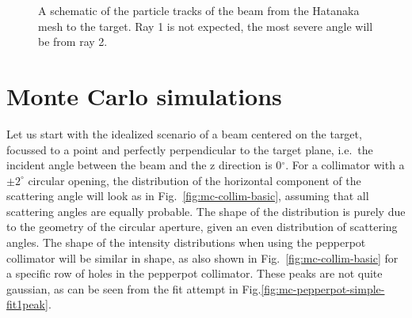 \documentclass[11pt]{report}
\begin{document}
\begin{figure}[!ht]
\centerline{\vspace{0cm}\hspace{0cm}
}
\centering
\caption{A schematic of the particle tracks of the beam from the Hatanaka mesh to the target. Ray 1 is not expected, the most severe angle will be from ray 2.}
\label{fig:ang-err-calc1}
\end{figure} 

\newpage

\section{Monte Carlo simulations}

Let us start with the idealized scenario of a beam centered on the target, focussed to a point and perfectly 
perpendicular to the target plane, i.e.~the incident angle between the beam and the z direction is 0$^{\circ}$.  For a collimator with a $\pm 2^{\circ}$ circular opening, the distribution of the horizontal component of the scattering angle will look as in Fig.~\ref{fig:mc-collim-basic}, assuming that all scattering angles are equally probable. The shape of the distribution is purely due to the geometry of the circular aperture, given an even distribution of scattering angles. The shape of the intensity distributions when using the pepperpot collimator will be similar in shape, as also shown in Fig.~\ref{fig:mc-collim-basic} for a specific row of holes
in the pepperpot collimator.  These peaks are not quite gaussian, as can be seen from the fit attempt 
in Fig.\ref{fig:mc-pepperpot-simple-fit1peak}.
\end{document}
